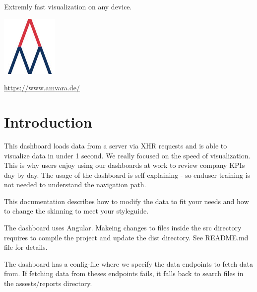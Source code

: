 \documentclass[11pt]{article}
\begin{document}
 
\maketitle %
\thispagestyle{empty}

\begin{centering} %
	Extremly fast visualization on any device.
	\bigskip
	\par
	\bigskip
	\bigskip
	\bigskip
	\bigskip
	\bigskip
	\bigskip
	\bigskip
	\bigskip
	\bigskip
	\bigskip	
	\bigskip
	\bigskip
	\bigskip
	\bigskip
	\bigskip
	\bigskip
	\bigskip
	\bigskip
	\bigskip
	\bigskip
	\bigskip
	\bigskip
	\includegraphics{amvara} \par
	\bigskip
	\url{https://www.amvara.de/} \par
	\bigskip
	\bigskip
	\date{\today}\par %
\end{centering}

\newpage %
\tableofcontents %
\thispagestyle{empty}
\newpage



\section{Introduction} %
This dashboard loads data from a server via XHR requests and is able to visualize data in under 1 second. We really focused on the speed of visualization. This is why users enjoy using our dashboards at work to review company KPIs day by day. The usage of the dashboard is self explaining - so enduser training is not needed to understand the navigation path. 
\bigskip

This documentation describes how to modify the data to fit your needs and how to change the skinning to meet your styleguide.
\bigskip

The dashboard uses Angular. Makeing changes to files inside the src directory requires to compile the project and update the dist directory. See README.md file for details.
\bigskip

The dashboard has a config-file where we specify the data endpoints to fetch data from. If fetching data from theses endpoints fails, it falls back to search files in the assests/reports directory. 
\bigskip
\end{document}

